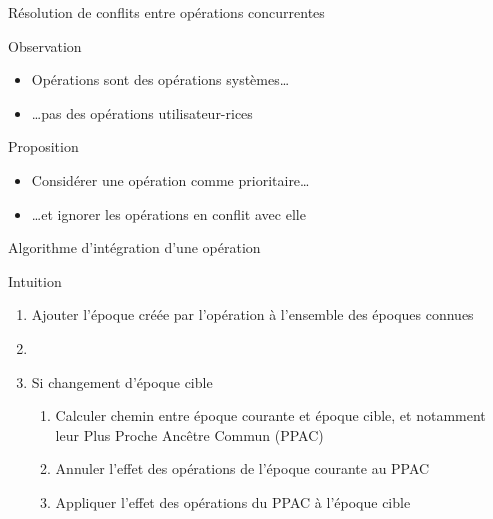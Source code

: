 \begin{frame}{Résolution de conflits entre opérations \ren concurrentes}
  \begin{block}{Observation}
    \begin{itemize}
      \item Opérations \ren sont des \alert{opérations systèmes}\dots
      \item \dots pas des \alert{opérations utilisateur-rices}
    \end{itemize}
  \end{block}
  \pause
  \begin{block}{Proposition}
    \begin{itemize}
      \item Considérer une \alert{opération \ren} comme \alert{prioritaire}\dots
      \item \dots et \alert{ignorer les opérations \ren en conflit} avec elle
    \end{itemize}
  \end{block}
\end{frame}

\begin{frame}{Algorithme d'intégration d'une opération \ren}
  \begin{block}{Intuition}
    \begin{enumerate}
      \item<2-> Ajouter l'époque créée par l'opération \ren à l'ensemble des époques connues
      \item<3->
      \item<4-> Si changement d'époque cible
      \begin{enumerate}
        \item<5-> Calculer chemin entre époque courante et époque cible, et notamment leur Plus Proche Ancêtre Commun (PPAC)
        \item<6-> Annuler l'effet des opérations \ren de l'époque courante au PPAC
        \item<7-> Appliquer l'effet des opérations \ren du PPAC à l'époque cible
      \end{enumerate}
    \end{enumerate}
  \end{block}
\end{frame}

